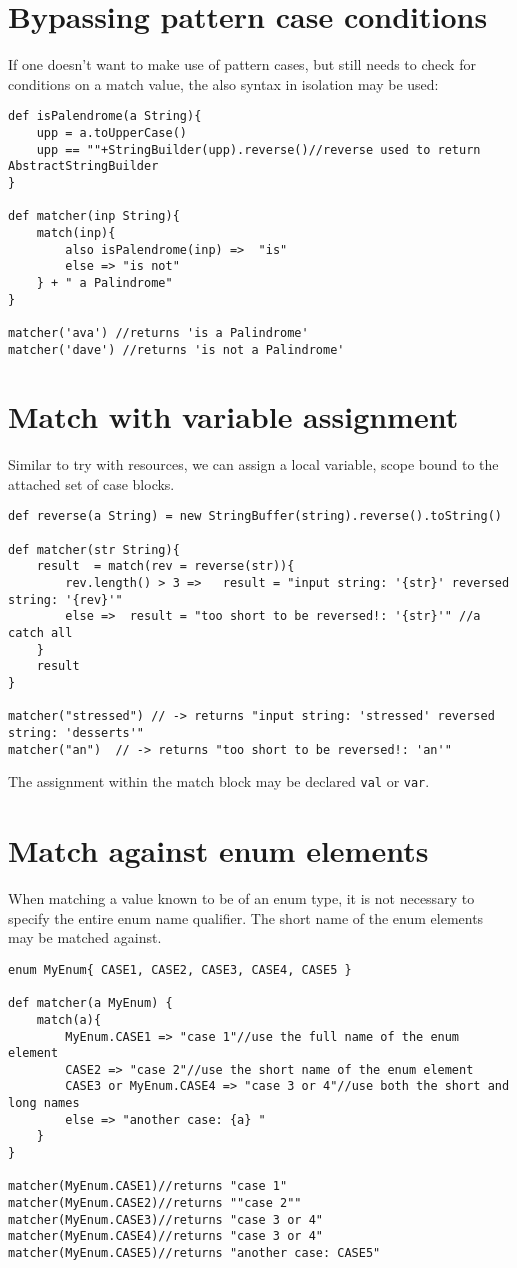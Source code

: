 \documentclass[conc-doc]{subfiles}
\begin{document}
\section{Bypassing pattern case conditions}
If one doesn't want to make use of pattern cases, but still needs to check for conditions on a match value, the also syntax in isolation may be used:

\begin{lstlisting}
def isPalendrome(a String){
	upp = a.toUpperCase()
	upp == ""+StringBuilder(upp).reverse()//reverse used to return AbstractStringBuilder
}
	
def matcher(inp String){
	match(inp){
		also isPalendrome(inp) =>  "is" 
		else => "is not" 
	} + " a Palindrome"
}

matcher('ava') //returns 'is a Palindrome'
matcher('dave') //returns 'is not a Palindrome'
\end{lstlisting}

\section{Match with variable assignment}
Similar to try with resources, we can assign a local variable, scope bound to the attached set of case blocks.

\begin{lstlisting}
def reverse(a String) = new StringBuffer(string).reverse().toString()

def matcher(str String){
	result  = match(rev = reverse(str)){
		rev.length() > 3 =>   result = "input string: '{str}' reversed string: '{rev}'" 
		else =>  result = "too short to be reversed!: '{str}'" //a catch all
	}
	result
}

matcher("stressed") // -> returns "input string: 'stressed' reversed string: 'desserts'"
matcher("an")  // -> returns "too short to be reversed!: 'an'"
\end{lstlisting}

The assignment within the match block may be declared \lstinline{val} or \lstinline{var}.

\section{Match against enum elements}
When matching a value known to be of an enum type, it is not necessary to specify the entire enum name qualifier. The short name of the enum elements may be matched against.

\begin{lstlisting}
enum MyEnum{ CASE1, CASE2, CASE3, CASE4, CASE5 }

def matcher(a MyEnum) {
	match(a){
		MyEnum.CASE1 => "case 1"//use the full name of the enum element
		CASE2 => "case 2"//use the short name of the enum element
		CASE3 or MyEnum.CASE4 => "case 3 or 4"//use both the short and long names
		else => "another case: {a} " 
	}
}

matcher(MyEnum.CASE1)//returns "case 1"
matcher(MyEnum.CASE2)//returns ""case 2""
matcher(MyEnum.CASE3)//returns "case 3 or 4"
matcher(MyEnum.CASE4)//returns "case 3 or 4"
matcher(MyEnum.CASE5)//returns "another case: CASE5"
\end{lstlisting}
\end{document}
